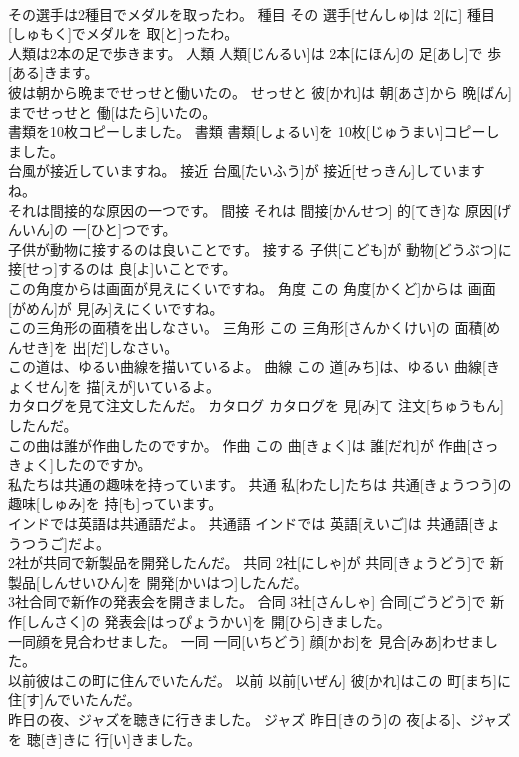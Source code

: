 \documentclass[8pt]{extreport}
\begin{document}
\begin{CJK}{UTF8}{min}
\\	その選手は2種目でメダルを取ったわ。	種目	その 選手[せんしゅ]は 2[に] 種目[しゅもく]でメダルを 取[と]ったわ。	
\\	人類は2本の足で歩きます。	人類	人類[じんるい]は 2本[にほん]の 足[あし]で 歩[ある]きます。	
\\	彼は朝から晩までせっせと働いたの。	せっせと	彼[かれ]は 朝[あさ]から 晩[ばん]までせっせと 働[はたら]いたの。	
\\	書類を10枚コピーしました。	書類	書類[しょるい]を 10枚[じゅうまい]コピーしました。	
\\	台風が接近していますね。	接近	台風[たいふう]が 接近[せっきん]していますね。	
\\	それは間接的な原因の一つです。	間接	それは 間接[かんせつ] 的[てき]な 原因[げんいん]の 一[ひと]つです。	
\\	子供が動物に接するのは良いことです。	接する	子供[こども]が 動物[どうぶつ]に 接[せっ]するのは 良[よ]いことです。	
\\	この角度からは画面が見えにくいですね。	角度	この 角度[かくど]からは 画面[がめん]が 見[み]えにくいですね。	
\\	この三角形の面積を出しなさい。	三角形	この 三角形[さんかくけい]の 面積[めんせき]を 出[だ]しなさい。	
\\	この道は、ゆるい曲線を描いているよ。	曲線	この 道[みち]は、ゆるい 曲線[きょくせん]を 描[えが]いているよ。	
\\	カタログを見て注文したんだ。	カタログ	カタログを 見[み]て 注文[ちゅうもん]したんだ。	
\\	この曲は誰が作曲したのですか。	作曲	この 曲[きょく]は 誰[だれ]が 作曲[さっきょく]したのですか。	
\\	私たちは共通の趣味を持っています。	共通	私[わたし]たちは 共通[きょうつう]の 趣味[しゅみ]を 持[も]っています。	
\\	インドでは英語は共通語だよ。	共通語	インドでは 英語[えいご]は 共通語[きょうつうご]だよ。	
\\	2社が共同で新製品を開発したんだ。	共同	2社[にしゃ]が 共同[きょうどう]で 新製品[しんせいひん]を 開発[かいはつ]したんだ。	
\\	3社合同で新作の発表会を開きました。	合同	3社[さんしゃ] 合同[ごうどう]で 新作[しんさく]の 発表会[はっぴょうかい]を 開[ひら]きました。	
\\	一同顔を見合わせました。	一同	一同[いちどう] 顔[かお]を 見合[みあ]わせました。	
\\	以前彼はこの町に住んでいたんだ。	以前	以前[いぜん] 彼[かれ]はこの 町[まち]に 住[す]んでいたんだ。	
\\	昨日の夜、ジャズを聴きに行きました。	ジャズ	昨日[きのう]の 夜[よる]、ジャズを 聴[き]きに 行[い]きました。	

\end{CJK}
\end{document}

